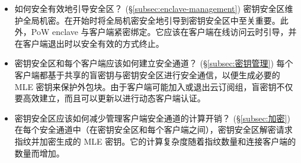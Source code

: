\begin{itemize}[leftmargin=*]
\item 如何安全有效地引导安全区？ (\S\ref{subsec:enclave-management})
  密钥安全区维护全局机密。在开始时将全局机密安全地引导到密钥安全区中至关重要。此外，PoW enclave 与客户端紧密绑定。它应该在客户端在线访问云时引导，并在客户端退出时以安全有效的方式终止。
\item 密钥安全区和每个客户端应该如何建立安全通道？ (\S\ref{subsec:密钥管理})
  每个客户端都基于共享的盲密钥与密钥安全区进行安全通信，以便生成必要的 MLE 密钥来保护外包块。由于客户端可能加入或退出云订阅组，盲密钥不仅要高效建立，而且可以更新以进行动态客户端认证。
\item 密钥安全区应该如何减少管理客户端安全通道的计算开销？ (\S\ref{subsec:加密})
  在每个安全通道中（在密钥安全区和每个客户端之间），密钥安全区解密请求指纹并加密生成的 MLE 密钥。它的计算复杂度随着指纹数量和连接客户端的数量而增加。
\end{itemize}
